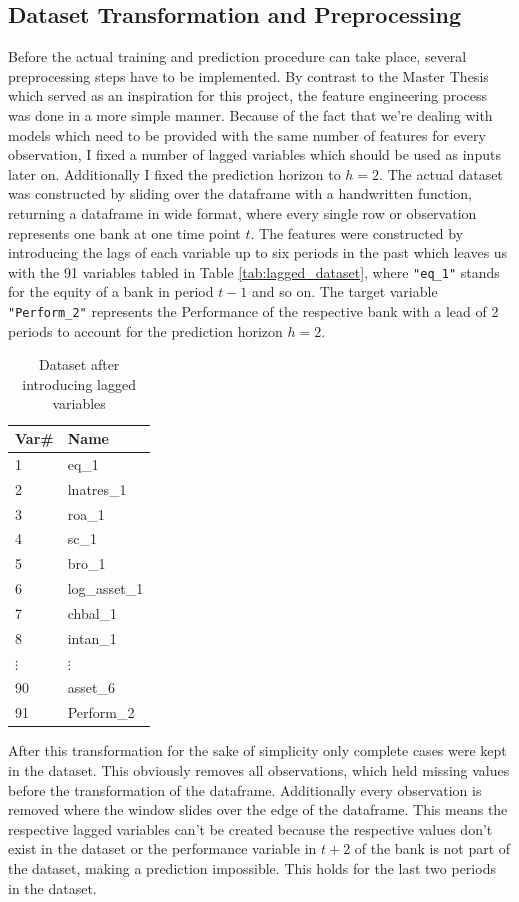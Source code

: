 \documentclass[12pt,a4paper]{article}
\begin{document}
\subsection{Dataset Transformation and Preprocessing}
Before the actual training and prediction procedure can take place, several preprocessing steps have to be implemented. By contrast to the Master Thesis which served as an inspiration for this project, the feature engineering process was done in a more simple manner. Because of the fact that we're dealing with models which need to be provided with the same number of features for every observation, I fixed a number of lagged variables which should be used as inputs later on. Additionally I fixed the prediction horizon to $h=2$. The actual dataset was constructed by sliding over the dataframe with a handwritten function, returning a dataframe in wide format, where every single row or observation represents one bank at one time point $t$. 
The features were constructed by introducing the lags of each variable up to six periods in the past which leaves us with the 91 variables tabled in Table \vref{tab:lagged_dataset}, where \verb+"eq_1"+ stands for the equity of a bank in period $t-1$ and so on. The target variable \verb+"Perform_2"+ represents the Performance of the respective bank with a lead of 2 periods to account for the prediction horizon $h = 2$.
\begin{table}[]
\centering
\begin{tabular}{@{}ll@{}}
\toprule
\textbf{Var\#} & \textbf{Name} \\ \midrule
1              & eq\_1         \\
2              & lnatres\_1    \\
3              & roa\_1        \\
4              & sc\_1         \\
5              & bro\_1        \\
6              & log\_asset\_1 \\
7              & chbal\_1      \\
8              & intan\_1      \\
$\vdots$       & $\vdots$      \\
90             & asset\_6      \\
91             & Perform\_2    \\ \bottomrule
\end{tabular}
\caption{Dataset after introducing lagged variables}
\label{tab:lagged_dataset}
\end{table}
After this transformation for the sake of simplicity only complete cases were kept in the dataset. This obviously removes all observations, which held missing values before the transformation of the dataframe. Additionally every observation is removed where the window slides over the edge of the dataframe. This means the respective lagged variables can't be created because the respective values don't exist in the dataset or the performance variable in $t+2$ of the bank is not part of the dataset, making a prediction impossible. This holds for the last two periods in the dataset.\par
\end{document}
